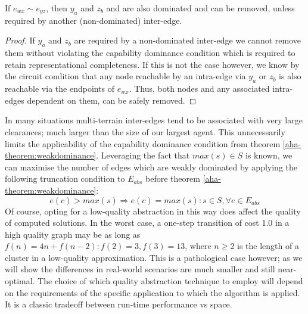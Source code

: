\begin{corollary}
If $e_{wx} \sim e_{yz}$, then $y_{a}$ and $z_{b}$ and are also dominated and can be removed, unless required by another (non-dominated) inter-edge. 
\end{corollary}
\begin{proof}
If $y_{a}$ and $z_{b}$ are required by a non-dominated inter-edge we cannot remove them without violating the capability dominance condition which is required to retain representational completeness. 
If this is not the case however, we know by the circuit condition that any node reachable by an intra-edge via $y_{a}$ or $z_{b}$ is also reachable via the endpoints of $e_{wx}$. 
Thus, both nodes and any associated intra-edges dependent on them, can be safely removed.
\end{proof}
In many situations multi-terrain inter-edges tend to be associated with very large clearances; much larger than the size of our largest agent.
This unnecessarily limits the applicability of the capability dominance condition from theorem \ref{aha-theorem:weakdominance}. 
Leveraging the fact that $max(s) \in S$ is known, we can maximise the number of edges which are weakly dominated by applying the following truncation condition to $E_{abs}$ before theorem \ref{aha-theorem:weakdominance}:
$$
e(c) > max(s) \Rightarrow e(c) = max(s) : s \in S, \forall e \in E_{abs}
$$
Of course, opting for a low-quality abstraction in this way does affect the quality of computed solutions. 
In the worst case, a one-step transition of cost 1.0 in a high quality graph may be as long as $f(n) = 4n + f(n-2) : f(2) = 3, f(3) = 13$, where $n \geq 2$ is the length of a cluster in a low-quality approximation.
This is a pathological case however; as we will show the differences in real-world scenarios are much smaller and still near-optimal. 
The choice of which quality abstraction technique to employ will depend on the requirements of the specific application to which the algorithm is applied.
It is a classic tradeoff between run-time performance vs space.
